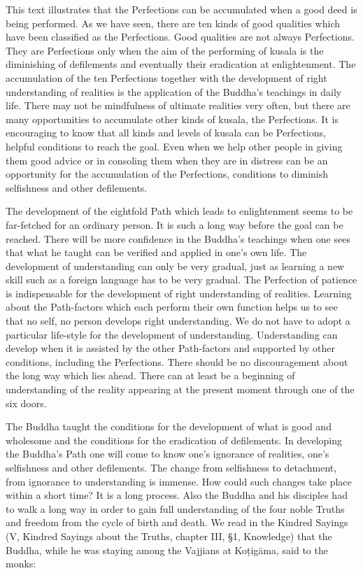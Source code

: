 \documentclass{book}
\begin{document}
This text illustrates that the Perfections can be accumulated when a
good deed is being performed. As we have seen, there are ten kinds of
good qualities which have been classified as the Perfections. Good
qualities are not always Perfections. They are Perfections only when the
aim of the performing of kusala is the diminishing of defile­ments and
eventually their eradication at enlightenment. The accumu­lation of the
ten Perfections together with the development of right understanding of
realities is the application of the Buddha's teachings in daily life.
There may not be mindfulness of ultimate realities very often, but there
are many opportunities to accumulate other kinds of kusala, the
Perfections. It is encouraging to know that all kinds and levels of
kusala can be Perfections, helpful conditions to reach the goal. Even
when we help other people in giving them good advice or in consoling
them when they are in distress can be an opportunity for the
accumulation of the Perfections, conditions to dimin­ish selfishness and
other defilements.

The development of the eightfold Path which leads to enlightenment seems
to be far-fetched for an ordinary person. It is such a long way before
the goal can be reached. There will be more confidence in the Buddha's
teachings when one sees that what he taught can be verified and applied
in one's own life. The development of understanding can only be very
gradual, just as learning a new skill such as a foreign language has to
be very gradual. The Perfection of patience is indispensable for the
development of right understanding of realities. Learning about the
Path-factors which each perform their own function helps us to see that
no self, no person develops right understanding. We do not have to adopt
a particular life-style for the development of understanding.
Under­standing can develop when it is assisted by the other Path-factors
and supported by other conditions, including the Perfections. There
should be no discouragement about the long way which lies ahead. There
can at least be a beginning of understanding of the reality appearing at
the present moment through one of the six doors.

The Buddha taught the conditions for the development of what is good and
wholesome and the conditions for the eradication of defilements. In
developing the Buddha's Path one will come to know one's ignorance of
realities, one's selfishness and other defilements. The change from
selfishness to detachment, from ignorance to under­standing is immense.
How could such changes take place within a short time? It is a long
process. Also the Buddha and his disciples had to walk a long way in
order to gain full understanding of the four noble Truths and freedom
from the cycle of birth and death. We read in the Kindred Sayings (V,
Kindred Sayings about the Truths, chapter III, §1, Knowledge) that the
Buddha, while he was staying among the Vajjians at Koṭigāma, said to the
monks:
\end{document}
